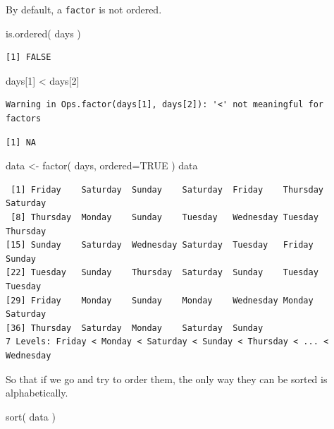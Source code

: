 \documentclass[
  letterpaper,
]{book}
\newenvironment{Shaded}{\begin{snugshade}}{\end{snugshade}}
\newcommand{\AttributeTok}[1]{\textcolor[rgb]{0.40,0.45,0.13}{#1}}
\newcommand{\ConstantTok}[1]{\textcolor[rgb]{0.56,0.35,0.01}{#1}}
\newcommand{\DecValTok}[1]{\textcolor[rgb]{0.68,0.00,0.00}{#1}}
\newcommand{\FunctionTok}[1]{\textcolor[rgb]{0.28,0.35,0.67}{#1}}
\newcommand{\NormalTok}[1]{\textcolor[rgb]{0.00,0.23,0.31}{#1}}
\newcommand{\OtherTok}[1]{\textcolor[rgb]{0.00,0.23,0.31}{#1}}
\newcommand{\SpecialCharTok}[1]{\textcolor[rgb]{0.37,0.37,0.37}{#1}}
\begin{document}
By default, a \texttt{factor} is not ordered.

\begin{Shaded}
\begin{Highlighting}[]
\FunctionTok{is.ordered}\NormalTok{( days )}
\end{Highlighting}
\end{Shaded}

\begin{verbatim}
[1] FALSE
\end{verbatim}

\begin{Shaded}
\begin{Highlighting}[]
\NormalTok{days[}\DecValTok{1}\NormalTok{] }\SpecialCharTok{\textless{}}\NormalTok{ days[}\DecValTok{2}\NormalTok{]}
\end{Highlighting}
\end{Shaded}

\begin{verbatim}
Warning in Ops.factor(days[1], days[2]): '<' not meaningful for factors
\end{verbatim}

\begin{verbatim}
[1] NA
\end{verbatim}

\begin{Shaded}
\begin{Highlighting}[]
\NormalTok{data }\OtherTok{\textless{}{-}} \FunctionTok{factor}\NormalTok{( days, }\AttributeTok{ordered=}\ConstantTok{TRUE}\NormalTok{ )}
\NormalTok{data }
\end{Highlighting}
\end{Shaded}

\begin{verbatim}
 [1] Friday    Saturday  Sunday    Saturday  Friday    Thursday  Saturday 
 [8] Thursday  Monday    Sunday    Tuesday   Wednesday Tuesday   Thursday 
[15] Sunday    Saturday  Wednesday Saturday  Tuesday   Friday    Sunday   
[22] Tuesday   Sunday    Thursday  Saturday  Sunday    Tuesday   Tuesday  
[29] Friday    Monday    Sunday    Monday    Wednesday Monday    Saturday 
[36] Thursday  Saturday  Monday    Saturday  Sunday   
7 Levels: Friday < Monday < Saturday < Sunday < Thursday < ... < Wednesday
\end{verbatim}

So that if we go and try to order them, the only way they can be sorted
is alphabetically.

\begin{Shaded}
\begin{Highlighting}[]
\FunctionTok{sort}\NormalTok{( data )}
\end{Highlighting}
\end{Shaded}
\end{document}
